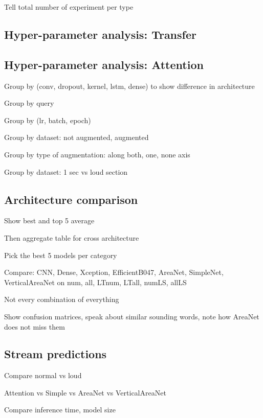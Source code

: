 Tell total number of experiment per type

\subsection{Hyper-parameter analysis: Transfer}

\subsection{Hyper-parameter analysis: Attention}

Group by (conv, dropout, kernel, lstm, dense) to show difference in architecture

Group by query

Group by (lr, batch, epoch)

Group by dataset: not augmented, augmented

Group by type of augmentation: along both, one, none axis

Group by dataset: 1 sec vs loud section

\subsection{Architecture comparison}

Show best and top 5 average

Then aggregate table for cross architecture

Pick the best 5 models per category

Compare: CNN, Dense, Xception, EfficientB047, AreaNet, SimpleNet,
VerticalAreaNet on num, all, LTnum, LTall, numLS, allLS

Not every combination of everything

Show confusion matrices, speak about similar sounding words, note how AreaNet
does not miss them

\subsection{Stream predictions}

Compare normal vs loud

Attention vs Simple vs AreaNet vs VerticalAreaNet

Compare inference time, model size
